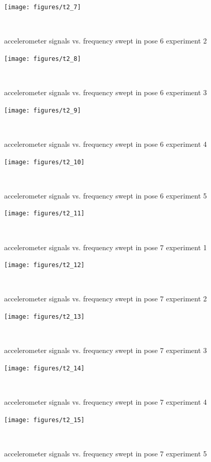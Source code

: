 \documentclass{sigchi}
\begin{document}
\begin{figure}
  \centering
  \texttt{[image: figures/t2\_7]}
  \caption{accelerometer signals vs. frequency swept in pose 6 experiment 2}
    ~\label{fig:t2_7}
\end{figure}

\begin{figure}
  \centering
  \texttt{[image: figures/t2\_8]}
  \caption{accelerometer signals vs. frequency swept in pose 6 experiment 3}
    ~\label{fig:t2_8}
\end{figure}

\begin{figure}
  \centering
  \texttt{[image: figures/t2\_9]}
  \caption{accelerometer signals vs. frequency swept in pose 6 experiment 4}
    ~\label{fig:t2_9}
\end{figure}

\begin{figure}
  \centering
  \texttt{[image: figures/t2\_10]}
  \caption{accelerometer signals vs. frequency swept in pose 6 experiment 5}
    ~\label{fig:t2_10}
\end{figure}

\begin{figure}
  \centering
  \texttt{[image: figures/t2\_11]}
  \caption{accelerometer signals vs. frequency swept in pose 7 experiment 1}
    ~\label{fig:t2_11}
\end{figure}

\begin{figure}
  \centering
  \texttt{[image: figures/t2\_12]}
  \caption{accelerometer signals vs. frequency swept in pose 7 experiment 2}
    ~\label{fig:t2_12}
\end{figure}

\begin{figure}
  \centering
  \texttt{[image: figures/t2\_13]}
  \caption{accelerometer signals vs. frequency swept in pose 7 experiment 3}
    ~\label{fig:t2_13}
\end{figure}

\begin{figure}
  \centering
  \texttt{[image: figures/t2\_14]}
  \caption{accelerometer signals vs. frequency swept in pose 7 experiment 4}
    ~\label{fig:t2_14}
\end{figure}

\begin{figure}
  \centering
  \texttt{[image: figures/t2\_15]}
  \caption{accelerometer signals vs. frequency swept in pose 7 experiment 5}
    ~\label{fig:t2_15}
\end{figure}
\end{document}
